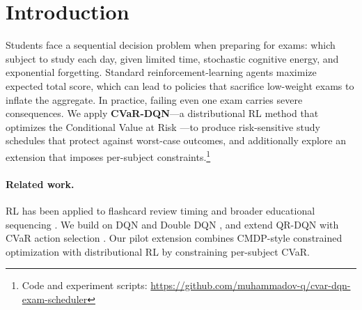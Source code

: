 \documentclass[a4paper,11pt]{article}
\theoremstyle{definition}
\begin{document}
\begin{abstract}
We address optimal exam study scheduling using reinforcement learning. A student must allocate limited study days across multiple subjects, balancing knowledge acquisition against forgetting, energy constraints, and subject dependencies. Standard DQN maximizes expected total score but may sacrifice individual exams. We apply \textbf{CVaR-DQN}, a distributional RL method that optimizes the Conditional Value at Risk, to produce risk-sensitive schedules that protect against worst-case outcomes. We evaluate seven methods across three environment configurations: CVaR-DQN consistently improves CVaR$_{10\%}$ over DQN while sacrificing a small amount of mean return, exactly the trade-off the algorithm is designed to make. Ablation studies show energy stochasticity is the primary source of outcome variance, and removing it eliminates the mean--risk gap entirely. As a pilot, we explore \emph{Subject-Constrained CVaR-DQN}---a Multi-Objective Distributional Constrained MDP with per-subject CVaR constraints---which reduces Physics failure on Medium from 30\% to 8\% but underperforms on aggregate metrics and under distribution shift, motivating adaptive thresholding as future work.
\end{abstract}

\section{Introduction}
\label{sec:intro}

Students face a sequential decision problem when preparing for exams: which subject to study each day, given limited time, stochastic cognitive energy, and exponential forgetting. Standard reinforcement-learning agents maximize expected total score, which can lead to policies that sacrifice low-weight exams to inflate the aggregate. In practice, failing even one exam carries severe consequences. We apply \textbf{CVaR-DQN}---a distributional RL method that optimizes the Conditional Value at Risk \citep{chow2015,dabney2018}---to produce risk-sensitive study schedules that protect against worst-case outcomes, and additionally explore an extension that imposes per-subject constraints.\footnote{Code and experiment scripts: \url{https://github.com/muhammadov-q/cvar-dqn-exam-scheduler}}

\paragraph{Related work.} RL has been applied to flashcard review timing \citep{reddy2017} and broader educational sequencing \citep{doroudi2019}. We build on DQN \citep{mnih2015} and Double DQN \citep{vanhasselt2016}, and extend QR-DQN \citep{dabney2018} with CVaR action selection \citep{chow2015}. Our pilot extension combines CMDP-style constrained optimization \citep{altman1999,achiam2017} with distributional RL by constraining per-subject CVaR.
\end{document}
